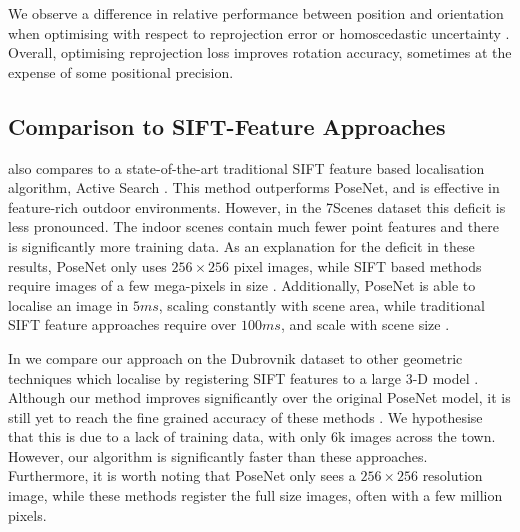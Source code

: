 We observe a difference in relative performance between position and orientation when optimising with respect to reprojection error  or homoscedastic uncertainty . Overall, optimising reprojection loss improves rotation accuracy, sometimes at the expense of some positional precision.

\subsection{Comparison to SIFT-Feature Approaches}

 also compares to a state-of-the-art traditional SIFT feature based localisation algorithm, Active Search \citep{sattler2016efficient}. This method outperforms PoseNet, and is effective in feature-rich outdoor environments. However, in the 7Scenes dataset this deficit is less pronounced. The indoor scenes contain much fewer point features and there is significantly more training data. As an explanation for the deficit in these results, PoseNet only uses $256\times 256$ pixel images, while SIFT based methods require images of a few mega-pixels in size \citep{sattler2016efficient}. Additionally, PoseNet is able to localise an image in $5ms$, scaling constantly with scene area, while traditional SIFT feature approaches require over $100ms$, and scale with scene size \citep{sattler2016efficient}.

In  we compare our approach on the Dubrovnik dataset to other geometric techniques which localise by registering SIFT features \citep{lowe2004distinctive} to a large 3-D model \citep{li2012worldwide}. Although our method improves significantly over the original PoseNet model, it is still yet to reach the fine grained accuracy of these methods \citep{svarm2014accurate,zeisl2015camera,sattler2011fast,li2010location}. We hypothesise that this is due to a lack of training data, with only 6k images across the town. However, our algorithm is significantly faster than these approaches. Furthermore, it is worth noting that PoseNet only sees a $256\times256$ resolution image, while these methods register the full size images, often with a few million pixels.
	
